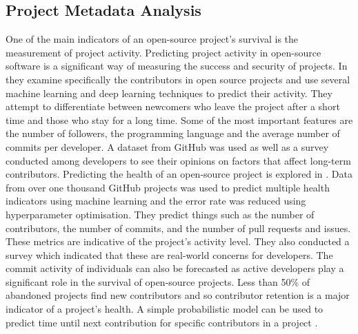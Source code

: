 \documentclass[conference]{IEEEtran}
\begin{document}
\subsection{Project Metadata Analysis}
One of the main indicators of an open-source project's survival is the measurement of project activity. Predicting project activity in open-source software is a significant way of measuring the success and security of projects. In \cite{l_bao_large_2021} they examine specifically the contributors in open source projects and use several machine learning and deep learning techniques to predict their activity. They attempt to differentiate between newcomers who leave the project after a short time and those who stay for a long time. Some of the most important features are the number of followers, the programming language and the average number of commits per developer. A dataset from GitHub was used as well as a survey conducted among developers to see their opinions on factors that affect long-term contributors. Predicting the health of an open-source project is explored in \cite{xia_predicting_2022}. Data from over one thousand GitHub projects was used to predict multiple health indicators using machine learning and the error rate was reduced using hyperparameter optimisation. They predict things such as the number of contributors, the number of commits, and the number of pull requests and issues. These metrics are indicative of the project’s activity level. They also conducted a survey which indicated that these are real-world concerns for developers. The commit activity of individuals can also be forecasted as active developers play a significant role in the survival of open-source projects. Less than 50\% of abandoned projects find new contributors and so contributor retention is a major indicator of a project's health. A simple probabilistic model can be used to predict time until next contribution for specific contributors in a project \cite{decan_gap_2020}.
\end{document}
